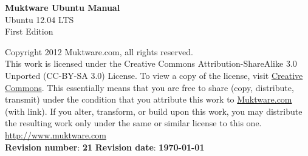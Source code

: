 \begin{titlepage}
  
\begin{center}
	{\Huge \bfseries Muktware Ubuntu Manual}\\[1cm]
	{\Large Ubuntu 12.04 LTS} \\[1cm]
	{\Large First Edition}\\ [17cm]
\end{center}

\begin{minipage}[t]{0.85\textwidth} 
 Copyright 2012 Muktware.com, all rights reserved. \\
 
 This work is licensed under the Creative Commons Attribution-ShareAlike 3.0 Unported (CC-BY-SA 3.0) License. To view a copy of the license, visit \href{http://creativecommons.org/licenses/by-sa/3.0/}{Creative Commons}. This essentially means that you are free to share (copy, distribute, transmit) under the condition that you attribute this work to \href{http://www.muktware.com/Muktware.com}{Muktware.com} (with link). If you alter, transform, or build upon this work, you may distribute the resulting work only under the same or similar license to this one. \\ 
 
\href{http://www.muktware.com}{http://www.muktware.com} \\
 
 \textbf{Revision number}: \textbf{21}	\hspace{0.5cm} \textbf{Revision date}: \textbf{ \today}
 \end{minipage}


\end{titlepage}